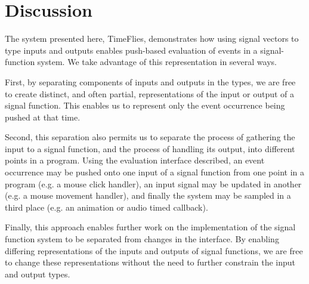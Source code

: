 \section{Discussion}
\label{section:Discussion}

The system presented here, TimeFlies, demonstrates how using signal vectors
to type inputs and outputs enables push-based evaluation of events in a
signal-function system. We take advantage of this representation in several ways.

First, by separating components of inputs and outputs in the types, we are free
to create distinct, and often partial, representations of the input or output
of a signal function. This enables us to represent only the event occurrence
being pushed at that time.

Second, this separation also permits us to separate the process of gathering
the input to a signal function, and the process of handling its output, into
different points in a program. Using the evaluation interface described, an
event occurrence may be pushed onto one input of a signal function from one
point in a program (e.g. a mouse click handler), an input signal
may be updated in another (e.g. a mouse movement handler), and finally the
system may be sampled in a third place (e.g. an animation or audio timed
callback).

Finally, this approach enables further work on the implementation of the signal
function system to be separated from changes in the interface. By enabling
differing representations of the inputs and outputs of signal functions, we are
free to change these representations without the need to further constrain the
input and output types.
